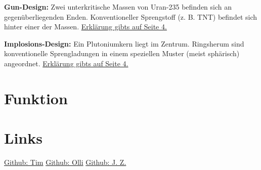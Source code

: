 \documentclass[a4paper,12pt]{article}
\begin{document}
\textbf{Gun-Design:}
Zwei unterkritische Massen von Uran-235 befinden sich an gegenüberliegenden Enden. 
Konventioneller Sprengstoff (z. B. TNT) befindet sich hinter einer der Massen. \hyperlink{gun_section}{Erklärung gibts auf Seite 4.}

\vspace*{4cm}

\noindent\textbf{Implosions-Design:}
Ein Plutoniumkern liegt im Zentrum. Ringsherum sind konventionelle Sprengladungen 
in einem speziellen Muster (meist sphärisch) angeordnet. \hyperlink{implosion_section}{Erklärung gibts auf Seite 4.}

\newpage

\section{Funktion}
\hypertarget{implosion_section}{}
\hypertarget{gun_section}{}

\newpage

\section{Links}
\begin{center}
\end{center}
\bigskip

\href{https://github.com/Tim-foe}{Github: Tim} \hspace{4cm}
\href{https://github.com/YoOlli}{Github: Olli} \hspace{4cm}
\href{https://github.com/Jason4225}{Github: J. Z.}



\end{document}
